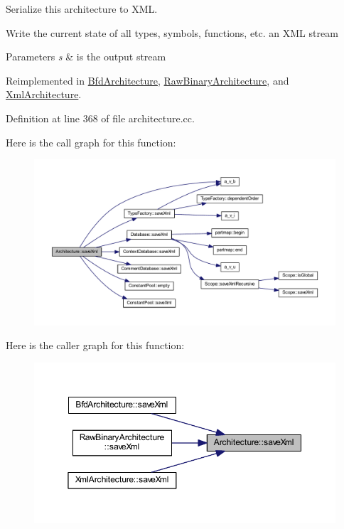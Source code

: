Serialize this architecture to X\+ML. 

Write the current state of all types, symbols, functions, etc. an X\+ML stream 
\begin{DoxyParams}{Parameters}
{\em s} & is the output stream \\
\hline
\end{DoxyParams}


Reimplemented in \mbox{\hyperlink{class_bfd_architecture_ac775d8894dd3abba1effafe22881a131}{Bfd\+Architecture}}, \mbox{\hyperlink{class_raw_binary_architecture_a3aafb658662f5d6af564e22f5b35aafc}{Raw\+Binary\+Architecture}}, and \mbox{\hyperlink{class_xml_architecture_abf5dd16b5343f89d2b165cf2206c7bf6}{Xml\+Architecture}}.



Definition at line 368 of file architecture.\+cc.

Here is the call graph for this function\+:
\nopagebreak
\begin{figure}[H]
\begin{center}
\leavevmode
\includegraphics[width=350pt]{class_architecture_af760a127622d4cdd4b6b436122478cb5_cgraph}
\end{center}
\end{figure}
Here is the caller graph for this function\+:
\nopagebreak
\begin{figure}[H]
\begin{center}
\leavevmode
\includegraphics[width=350pt]{class_architecture_af760a127622d4cdd4b6b436122478cb5_icgraph}
\end{center}
\end{figure}
\mbox{\label{class_architecture_afc351278b2e416181b2a7c5b65cc614b}} 
